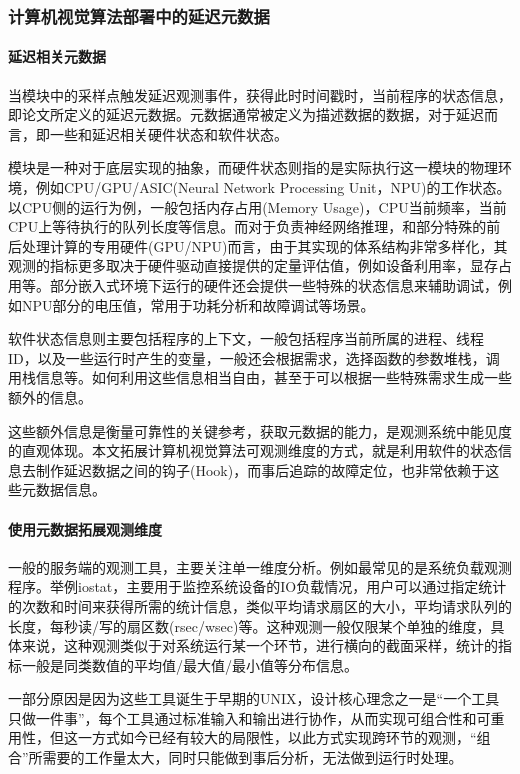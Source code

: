\documentclass[master]{shtthesis}
\begin{document}
\subsubsection{计算机视觉算法部署中的延迟元数据}\label{计算机视觉算法部署中的延迟元数据}
\paragraph{延迟相关元数据}
当模块中的采样点触发延迟观测事件，获得此时时间戳时，当前程序的状态信息，即论文所定义的延迟元数据。元数据通常被定义为描述数据的数据，对于延迟而言，即一些和延迟相关硬件状态和软件状态。

模块是一种对于底层实现的抽象，而硬件状态则指的是实际执行这一模块的物理环境，例如CPU/GPU/ASIC(Neural Network Processing Unit，NPU)的工作状态。以CPU侧的运行为例，一般包括内存占用(Memory Usage)，CPU当前频率，当前CPU上等待执行的队列长度等信息。而对于负责神经网络推理，和部分特殊的前后处理计算的专用硬件(GPU/NPU)而言，由于其实现的体系结构非常多样化，其观测的指标更多取决于硬件驱动直接提供的定量评估值，例如设备利用率，显存占用等。部分嵌入式环境下运行的硬件还会提供一些特殊的状态信息来辅助调试，例如NPU部分的电压值，常用于功耗分析和故障调试等场景。

软件状态信息则主要包括程序的上下文，一般包括程序当前所属的进程、线程ID，以及一些运行时产生的变量，一般还会根据需求，选择函数的参数堆栈，调用栈信息等。如何利用这些信息相当自由，甚至于可以根据一些特殊需求生成一些额外的信息。

这些额外信息是衡量可靠性的关键参考，获取元数据的能力，是观测系统中能见度的直观体现。本文拓展计算机视觉算法可观测维度的方式，就是利用软件的状态信息去制作延迟数据之间的钩子(Hook)，而事后追踪的故障定位，也非常依赖于这些元数据信息。
\paragraph{使用元数据拓展观测维度}\label{使用元数据拓展观测维度}
一般的服务端的观测工具，主要关注单一维度分析。例如最常见的是系统负载观测程序。举例iostat\cite{chandran2014monitoring}，主要用于监控系统设备的IO负载情况，用户可以通过指定统计的次数和时间来获得所需的统计信息，类似平均请求扇区的大小，平均请求队列的长度，每秒读/写的扇区数(rsec/wsec)等。这种观测一般仅限某个单独的维度，具体来说，这种观测类似于对系统运行某一个环节，进行横向的截面采样，统计的指标一般是同类数值的平均值/最大值/最小值等分布信息。

一部分原因是因为这些工具诞生于早期的UNIX，设计核心理念之一是“一个工具只做一件事”，每个工具通过标准输入和输出进行协作，从而实现可组合性和可重用性，但这一方式如今已经有较大的局限性，以此方式实现跨环节的观测，“组合”所需要的工作量太大，同时只能做到事后分析，无法做到运行时处理。
\end{document}
